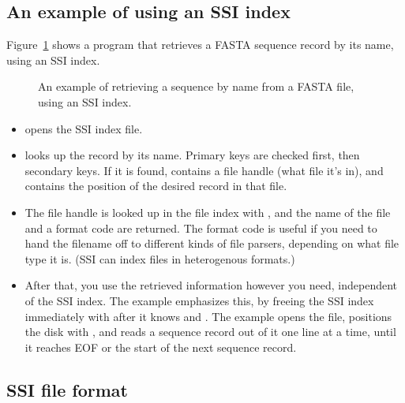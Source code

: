 \subsection{An example of using an SSI index}

Figure~\ref{fig:ssi_example2} shows a program that retrieves a FASTA
sequence record by its name, using an SSI index.

\begin{figure}

\caption{An example of retrieving a sequence by name from a FASTA
  file, using an SSI index.}
\label{fig:ssi_example2}
\end{figure}

\begin{itemize}
\item {} opens the SSI index file.

\item {} looks up the record by its name.
      Primary keys are checked first, then secondary keys. If it is
      found,  contains a file handle (what file it's in),
      and  contains the position of the desired record
      in that file.

\item The file handle  is looked up in the file index with
      , and the name of the file and a
      format code are returned. The format code is useful if you need
      to hand the filename off to different kinds of file parsers,
      depending on what file type it is. (SSI can index files in
      heterogenous formats.)

\item After that, you use the retrieved information however you need,
      independent of the SSI index. The example emphasizes this, by
      freeing the SSI index immediately with 
      after it knows  and . The example
      opens the file, positions the disk with , and
      reads a sequence record out of it one line at a time, until it
      reaches EOF or the start of the next sequence record.
\end{itemize}





\subsection{SSI file format} 

